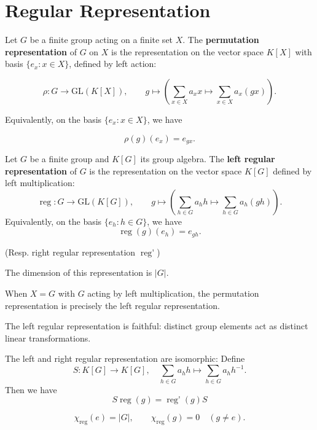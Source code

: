 \chapter{Regular Representation}

\begin{defn}
\label{Permutation Representation}
Let \(G\) be a finite group acting on a finite set \(X\).  
The \textbf{permutation representation} of \(G\) on \(X\) is the representation on the vector space \(K[X]\) with basis \(\{e_x : x \in X\}\), defined by left action:

\[
\rho : G \to \mathrm{GL}(K[X]), \qquad 
g\mapsto\left(\sum_{x \in X} a_x x \mapsto \sum_{x \in X} a_x (gx)\right).
\]

Equivalently, on the basis \(\{e_x : x \in X\}\), we have

\[
\rho(g)(e_x) = e_{gx}.
\]
\end{defn}


\begin{defn}
Let \(G\) be a finite group and \(K[G]\) its group algebra. 
The \textbf{left regular representation} of \(G\) is the representation on the vector space \(K[G]\) defined by left multiplication:
\[
\operatorname{reg}: G \to \mathrm{GL}(K[G]), \qquad 
g\mapsto\left(\sum_{h \in G} a_h h \mapsto \sum_{h \in G} a_h (gh)\right).
\]
Equivalently, on the basis \(\{e_h : h \in G\}\), we have
\[
\operatorname{reg}(g)(e_h) = e_{gh}.
\]

(Resp. right regular representation $\operatorname{reg'}$)

The dimension of this representation is \(|G|\).
\end{defn}


\begin{remark}
When \(X = G\) with \(G\) acting by left multiplication, the permutation representation is precisely the left regular representation.

The left regular representation is faithful: distinct group elements act as distinct linear transformations. 

The left and right regular representation are isomorphic:
Define
\[S: K[G]\to K[G],\quad\sum_{h \in G} a_h h \mapsto\sum_{h \in G} a_h h ^{-1}.\]
Then we have \[S \operatorname{reg}(g)=\operatorname{reg'}(g)S\]

\end{remark}

\begin{prop}
\[
\chi_{\operatorname{reg}}(e) = |G|, \qquad \chi_{\operatorname{reg}}(g) = 0 \quad (g \neq e).
\]
\end{prop}


